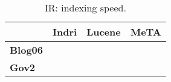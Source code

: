 \begin{table}[t]
\centering
{\small
\begin{tabular}{|l|r|r|r|}
        \hline & \textbf{Indri} & \textbf{Lucene} & \textbf{MeTA} \\
        \hline
        \textbf{Blog06} & & & \\
        \textbf{Gov2}    & & & \\
        \hline
\end{tabular}
\caption{IR: indexing speed.}
}
\label{table:ir-indexing}
\end{table}
